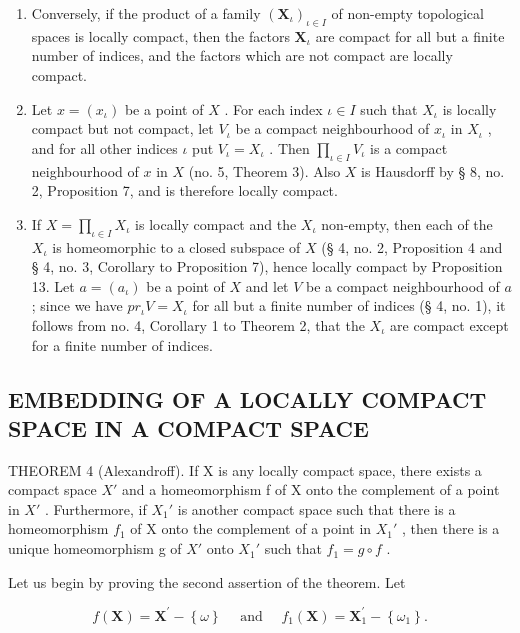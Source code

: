 \begin{enumerate}
\def\labelenumi{\alph{enumi})}
\setcounter{enumi}{1}
\item
  Conversely, if the product of a family \((\mathbf{X}_{\iota})_{\iota\in I}\) of non-empty topological spaces is locally compact, then the factors \(\mathbf{X}_{\iota}\) are compact for all but a finite number of indices, and the factors which are not compact are locally compact.
\item
  Let \(x = (x_{\iota})\) be a point of \(X\) . For each index \(\iota \in I\) such that \(X_{\iota}\) is locally compact but not compact, let \(V_{\iota}\) be a compact neighbourhood of \(x_{\iota}\) in \(X_{\iota}\) , and for all other indices \(\iota\) put \(V_{\iota} = X_{\iota}\) . Then \(\prod_{\iota \in I} V_{\iota}\) is a compact neighbourhood of \(x\) in \(X\) (no. 5, Theorem 3). Also \(X\) is Hausdorff by § 8, no. 2, Proposition 7, and is therefore locally compact.
\item
  If \(X = \prod_{\iota \in I} X_{\iota}\) is locally compact and the \(X_{\iota}\) non-empty, then each of the \(X_{\iota}\) is homeomorphic to a closed subspace of \(X\) (§ 4, no. 2, Proposition 4 and § 4, no. 3, Corollary to Proposition 7), hence locally compact by Proposition 13. Let \(a = (a_{\iota})\) be a point of \(X\) and let \(V\) be a compact neighbourhood of \(a\) ; since we have \(pr_{\iota}V = X_{\iota}\) for all but a finite number of indices (§ 4, no. 1), it follows from no. 4, Corollary 1 to Theorem 2, that the \(X_{\iota}\) are compact except for a finite number of indices.
\end{enumerate}

\subsection{EMBEDDING OF A LOCALLY COMPACT SPACE IN A COMPACT SPACE}

THEOREM 4 (Alexandroff). If X is any locally compact space, there exists a compact space \(X'\) and a homeomorphism f of X onto the complement of a point in \(X'\) . Furthermore, if \(X_{1}'\) is another compact space such that there is a homeomorphism \(f_{1}\) of X onto the complement of a point in \(X_{1}'\) , then there is a unique homeomorphism g of \(X'\) onto \(X_{1}'\) such that \(f_{1}=g\circ f\) .

Let us begin by proving the second assertion of the theorem. Let

\[
f (\mathbf {X}) = \mathbf {X} ^ {\prime} - \left\{\omega \right\} \quad \text { and } \quad f _ {1} (\mathbf {X}) = \mathbf {X} _ {1} ^ {\prime} - \left\{\omega_ {1} \right\}.
\]

